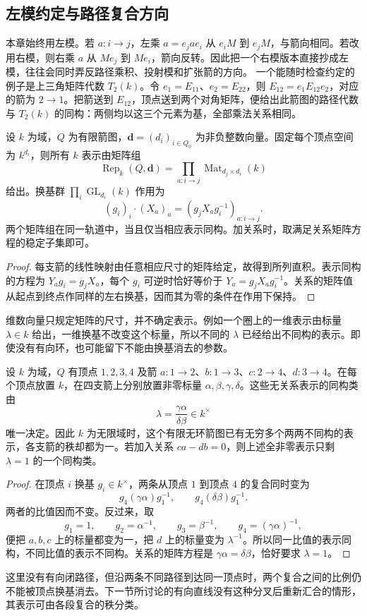 \subsection{左模约定与路径复合方向}
\label{b5:subsec:0902:03}

本章始终用左模。若 \(a:i\to j\)，左乘 \(a=e_jae_i\) 从 \(e_iM\) 到 \(e_jM\)，与箭向相同。若改用右模，则右乘 \(a\) 从 \(Me_j\) 到 \(Me_i\)，箭向反转。因此把一个右模版本直接抄成左模，往往会同时弄反路径乘积、投射模和扩张箭的方向。
\ProseParagraphBreak
一个能随时检查约定的例子是上三角矩阵代数 \(T_2(k)\)。令 \(e_1=E_{11}\)、\(e_2=E_{22}\)，则 \(E_{12}=e_1E_{12}e_2\)，对应的箭为 \(2\to1\)。把箭送到 \(E_{12}\)，顶点送到两个对角矩阵，便给出此箭图的路径代数与 \(T_2(k)\) 的同构：两侧均以这三个元素为基，全部乘法关系相同。
\begin{proposition}\label{b5:prop:quiver-change-of-basis}
	设 \(k\) 为域，\(Q\) 为有限箭图，\(\mathbf d=(d_i)_{i\in Q_0}\) 为非负整数向量。固定每个顶点空间为 \(k^{d_i}\)，则所有 \(k\) 表示由矩阵组
	\[
		\operatorname{Rep}_k(Q,\mathbf d) =\prod_{a:i\to j}\operatorname{Mat}_{d_j\times d_i}(k)
	\]
	给出。换基群 \(\prod_i\operatorname{GL}_{d_i}(k)\) 作用为
	\[
		(g_i)_i\cdot(X_a)_a=(g_jX_ag_i^{-1})_{a:i\to j}.
	\]
	两个矩阵组在同一轨道中，当且仅当相应表示同构。加关系时，取满足关系矩阵方程的稳定子集即可。
\end{proposition}
\begin{proof}
	每支箭的线性映射由任意相应尺寸的矩阵给定，故得到所列直积。表示同构的方程为 \(Y_ag_i=g_jX_a\)，每个 \(g_i\) 可逆时恰好等价于 \(Y_a=g_jX_ag_i^{-1}\)。关系的矩阵值从起点到终点作同样的左右换基，因而其为零的条件在作用下保持。
\end{proof}
维数向量只规定矩阵的尺寸，并不确定表示。例如一个圈上的一维表示由标量 \(\lambda\in k\) 给出，一维换基不改变这个标量，所以不同的 \(\lambda\) 已经给出不同构的表示。即使没有有向环，也可能留下不能由换基消去的参数。

\begin{proposition}\label{b5:prop:diamond-scalar-representations}
	设 \(k\) 为域，\(Q\) 有顶点 \(1,2,3,4\) 及箭 \(a:1\to2\)、\(b:1\to3\)、\(c:2\to4\)、\(d:3\to4\)。在每个顶点放置 \(k\)，在四支箭上分别放置非零标量 \(\alpha,\beta,\gamma,\delta\)。这些无关系表示的同构类由
	\[
		\lambda=\frac{\gamma\alpha}{\delta\beta}\in k^\times
	\]
	唯一决定。因此 \(k\) 为无限域时，这个有限无环箭图已有无穷多个两两不同构的表示，各支箭的秩却都为一。若加入关系 \(ca-db=0\)，则上述全非零表示只剩 \(\lambda=1\) 的一个同构类。
\end{proposition}
\begin{proof}
	在顶点 \(i\) 换基 \(g_i\in k^\times\)，两条从顶点 \(1\) 到顶点 \(4\) 的复合同时变为
	\[
		g_4(\gamma\alpha)g_1^{-1},\qquad g_4(\delta\beta)g_1^{-1}.
	\]
	两者的比值因而不变。反过来，取
	\[
		g_1=1,\qquad g_2=\alpha^{-1},\qquad g_3=\beta^{-1},\qquad g_4=(\gamma\alpha)^{-1},
	\]
	便把 \(a,b,c\) 上的标量都变为一，把 \(d\) 上的标量变为 \(\lambda^{-1}\)。所以同一比值的表示同构，不同比值的表示不同构。关系的矩阵方程是 \(\gamma\alpha=\delta\beta\)，恰好要求 \(\lambda=1\)。
\end{proof}
这里没有有向闭路径，但沿两条不同路径到达同一顶点时，两个复合之间的比例仍不能被顶点换基消去。下一节所讨论的有向直线没有这种分叉后重新汇合的情形，其表示可由各段复合的秩分类。
